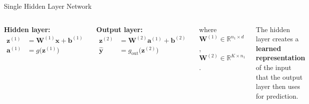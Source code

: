 \documentclass[aspectratio=169,11pt]{beamer}
\newcommand{\x}{\bm{x}}
\newcommand{\bb}{\bm{b}}
\newcommand{\z}{\bm{z}}
\newcommand{\W}{\bm{W}}
\renewcommand{\a}{\bm{a}}
\newcommand{\R}{\mathbb{R}}
\begin{document}
\begin{frame}{Single Hidden Layer Network}
\begin{columns}[T]
\textbf{Hidden layer:}
\begin{align*}
    \z^{(1)} &= \W^{(1)}\x + \bb^{(1)} \\
    \a^{(1)} &= g\!\big(\z^{(1)}\big)
\end{align*}

\textbf{Output layer:}
\begin{align*}
    \z^{(2)} &= \W^{(2)}\a^{(1)} + \bb^{(2)} \\
    \hat{\bm{y}} &= g_{\text{out}}\!\big(\z^{(2)}\big)
\end{align*}

where $\W^{(1)}\in\R^{n_1\times d}$, $\W^{(2)}\in\R^{K\times n_1}$.

\vspace{0.3cm}
{\small The hidden layer creates a \textbf{learned representation} of the input that the output layer then uses for prediction.}
\end{columns}
\end{frame}
\end{document}
